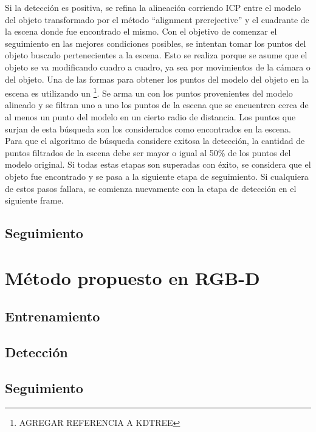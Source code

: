 Si la detección es positiva, se refina la alineación corriendo ICP entre el modelo del objeto transformado por el método ``alignment prerejective'' y el cuadrante de la escena donde fue encontrado el mismo. Con el objetivo de comenzar el seguimiento en las mejores condiciones posibles, se intentan tomar los puntos del objeto buscado pertenecientes a la escena. Esto se realiza porque se asume que el objeto se va modificando cuadro a cuadro, ya sea por movimientos de la cámara o del objeto. Una de las formas para obtener los puntos del modelo del objeto en la escena es utilizando un \kdt\footnote{AGREGAR REFERENCIA A KDTREE}.  Se arma un \kdt con los puntos provenientes del modelo alineado y se filtran uno a uno los puntos de la escena que se encuentren cerca de al menos un punto del modelo en un cierto radio de distancia.  Los puntos que surjan de esta búsqueda son los considerados como encontrados en la escena. Para que el algoritmo de búsqueda considere exitosa la detección, la cantidad de puntos filtrados de la escena debe ser mayor o igual al 50\% de los puntos del modelo original. Si todas estas etapas son superadas con éxito, se considera que el objeto fue encontrado y se pasa a la siguiente etapa de seguimiento. Si cualquiera de estos pasos fallara, se comienza nuevamente con la etapa de detección en el siguiente frame.


\subsection{Seguimiento}


\section{Método propuesto en RGB-D}\label{metodo_rgbd}

\subsection{Entrenamiento}

\subsection{Detección}

\subsection{Seguimiento}\label{tracking_rgbd}











